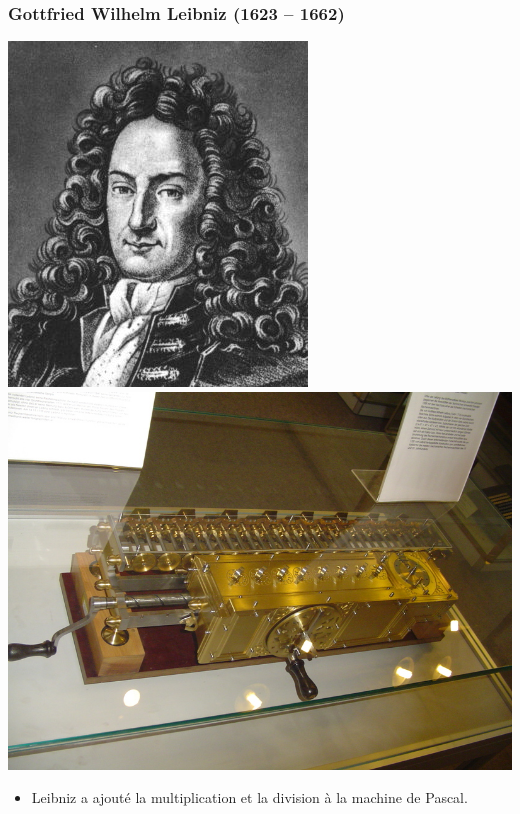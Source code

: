 \documentclass[utf8,10pt]{beamer}
\begin{document}
\begin{frame}
    \frametitle{Gottfried Wilhelm Leibniz (1623 -- 1662)}
    \begin{center}
        \includegraphics[scale=0.38]{./images/Leibniz.jpg}
        \hfill
        \includegraphics[scale=0.22]{./images/machine-leibniz.jpg}
    \end{center}
    
    \begin{itemize}
         
        \item Leibniz a ajouté la multiplication et la division à la machine de Pascal.
    \end{itemize}
    
    \hfill \hyperlink{http://fr.wikipedia.org/wiki/Gottfried_Wilhelm_Leibniz}{}
\end{frame}
\end{document}
